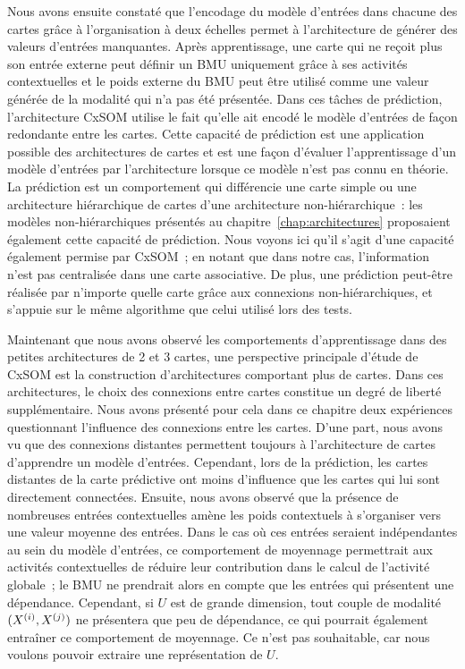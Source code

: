 \documentclass[../main]{subfiles}
\begin{document}
Nous avons ensuite constaté que l'encodage du modèle d'entrées dans chacune des cartes grâce à l'organisation à deux échelles permet à l'architecture de générer des valeurs d'entrées manquantes. Après apprentissage, une carte qui ne reçoit plus son entrée externe peut définir un BMU uniquement grâce à ses activités contextuelles et le poids externe du BMU peut être utilisé comme une valeur générée de la modalité qui n'a pas été présentée.
Dans ces tâches de prédiction, l'architecture CxSOM utilise le fait qu'elle ait encodé le modèle d'entrées de façon redondante entre les cartes. 
Cette capacité de prédiction est une application possible des architectures de cartes et est une façon d'évaluer l'apprentissage d'un modèle d'entrées par l'architecture lorsque ce modèle n'est pas connu en théorie.
La prédiction est un comportement qui différencie une carte simple ou une architecture hiérarchique de cartes d'une architecture non-hiérarchique~: les modèles non-hiérarchiques présentés au chapitre~\ref{chap:architectures} proposaient également cette capacité de prédiction. Nous voyons ici qu'il s'agit d'une capacité également permise par CxSOM~; en notant que dans notre cas, l'information n'est pas centralisée dans une carte associative. De plus, une prédiction peut-être réalisée par n'importe quelle carte grâce aux connexions non-hiérarchiques, et s'appuie sur le même algorithme que celui utilisé lors des tests.

Maintenant que nous avons observé les comportements d'apprentissage dans des petites architectures de 2 et 3 cartes, une perspective principale d'étude de CxSOM est la construction d'architectures comportant plus de cartes.
Dans ces architectures, le choix des connexions entre cartes constitue un degré de liberté supplémentaire.
Nous avons présenté pour cela dans ce chapitre deux expériences questionnant l'influence des connexions entre les cartes.
D'une part, nous avons vu que des connexions distantes permettent toujours à l'architecture de cartes d'apprendre un modèle d'entrées. Cependant, lors de la prédiction, les cartes distantes de la carte prédictive ont moins d'influence que les cartes qui lui sont directement connectées.
Ensuite, nous avons observé que la présence de nombreuses entrées contextuelles amène les poids contextuels à s'organiser vers une valeur moyenne des entrées. Dans le cas où ces entrées seraient indépendantes au sein du modèle d'entrées, ce comportement de moyennage permettrait aux activités contextuelles de réduire leur contribution dans le calcul de l'activité globale~; le BMU ne prendrait alors en compte que les entrées qui présentent une dépendance.
Cependant, si $U$ est de grande dimension, tout couple de modalité $(X^{({i})}, X^{({j})})$ ne présentera que peu de dépendance, ce qui pourrait également entraîner ce comportement de moyennage. Ce n'est pas souhaitable, car nous voulons pouvoir extraire une représentation de $U$. 
\end{document}
